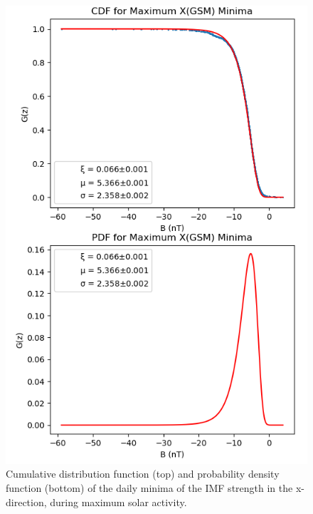 \documentclass[12pt]{article}
\begin{document}
\begin{figure}[t!]
            \begin{minipage}{0.48\textwidth}
                \centering
                \includegraphics[width=\textwidth]{fig_method/MFImaxXmin.png}
                \caption{Cumulative distribution function (top) and probability density function (bottom) of the daily minima of the IMF strength in the x-direction, during maximum solar activity.}
                \label{fig:MFImaxXmin}
            \end{minipage}
        \end{figure}
\end{document}
